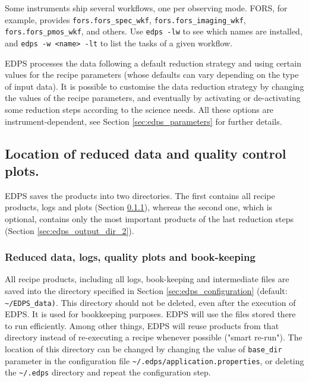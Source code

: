 Some instruments ship several workflows, one per observing mode. FORS, for example, provides {\tt fors.fors\_spec\_wkf}, {\tt fors.fors\_imaging\_wkf}, {\tt fors.fors\_pmos\_wkf}, and others. Use {\tt edps -lw} to see which names are installed, and {\tt edps -w <name> -lt} to list the tasks of a given workflow.

EDPS processes the data following a default reduction strategy and using certain values for the recipe parameters (whose defaults can vary depending on the type of input data). It is possible to customise the data reduction strategy by changing the values of the recipe parameters, and eventually by activating or de-activating some reduction steps according to the science needs. All these options are instrument-dependent, see Section \ref{sec:edps_parameters} for further details.


\subsection{Location of reduced data and quality control plots.}
\label{sec:edps_output_dir}


EDPS saves the products into two directories. The first contains all recipe  products, logs and plots (Section \ref{sec:edps_output_dir_1}), whereas the second one, which is optional, contains only the most important products of the last reduction steps (Section \ref{sec:edps_output_dir_2}).

\subsubsection{Reduced data, logs, quality plots and book-keeping}
\label{sec:edps_output_dir_1}
All recipe products, including all logs, book-keeping and intermediate files are saved into the directory specified in Section \ref{sec:edps_configuration} (default: {\tt \textasciitilde/EDPS\_data)}. This directory should not be deleted, even after the execution of EDPS. It is used for bookkeeping purposes. EDPS will use the files stored there to run efficiently. Among other things, EDPS will reuse products from that directory instead of re-executing a recipe whenever possible ("smart re-run").  The location of this directory can be changed by changing
the value of {\tt base\_dir} parameter in the configuration file {\tt \textasciitilde/.edps/application.properties}, or deleting the {\tt \textasciitilde/.edps} directory and repeat the configuration step. 




